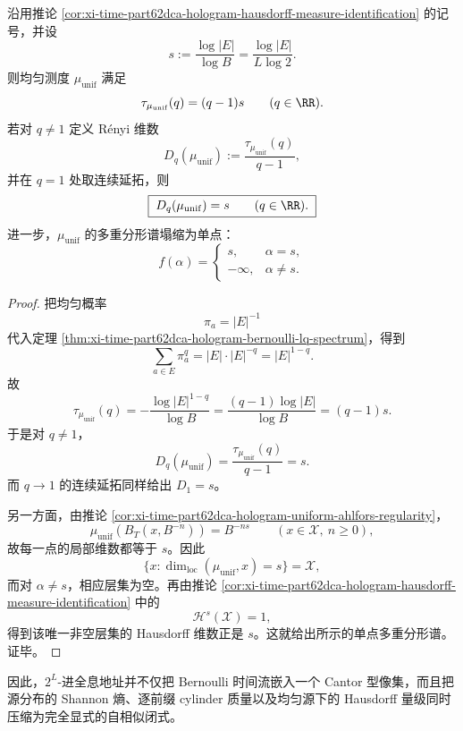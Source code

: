 \begin{corollary}\label{cor:xi-time-part62dca-hologram-uniform-monofractal-collapse}
沿用推论 \ref{cor:xi-time-part62dca-hologram-hausdorff-measure-identification} 的记号，并设
\[
s:=\frac{\log |E|}{\log B}
=
\frac{\log |E|}{L\log 2}.
\]
则均匀测度 \(\mu_{\mathrm{unif}}\) 满足
\[
\tau_{\mu_{\mathrm{unif}}}(q)=(q-1)s
\qquad
(q\in\RR).
\]
若对 \(q\neq 1\) 定义 Rényi 维数
\[
D_q(\mu_{\mathrm{unif}}):=\frac{\tau_{\mu_{\mathrm{unif}}}(q)}{q-1},
\]
并在 \(q=1\) 处取连续延拓，则
\[
\boxed{\;
D_q(\mu_{\mathrm{unif}})=s
\qquad
(q\in\RR).\;}
\]
进一步，\(\mu_{\mathrm{unif}}\) 的多重分形谱塌缩为单点：
\[
\boxed{\;
f(\alpha)=
\begin{cases}
s,& \alpha=s,\\
-\infty,& \alpha\neq s.
\end{cases}\;}
\]
\end{corollary}
\begin{proof}
把均匀概率
\[
\pi_a=|E|^{-1}
\]
代入定理 \ref{thm:xi-time-part62dca-hologram-bernoulli-lq-spectrum}，得到
\[
\sum_{a\in E}\pi_a^q
=
|E|\cdot |E|^{-q}
=
|E|^{1-q}.
\]
故
\[
\tau_{\mu_{\mathrm{unif}}}(q)
=
-\frac{\log |E|^{1-q}}{\log B}
=
\frac{(q-1)\log|E|}{\log B}
=(q-1)s.
\]
于是对 \(q\neq 1\)，
\[
D_q(\mu_{\mathrm{unif}})
=
\frac{\tau_{\mu_{\mathrm{unif}}}(q)}{q-1}
=
s.
\]
而 \(q\to 1\) 的连续延拓同样给出 \(D_1=s\)。

另一方面，由推论 \ref{cor:xi-time-part62dca-hologram-uniform-ahlfors-regularity}，
\[
\mu_{\mathrm{unif}}(B_T(x,B^{-n}))=B^{-ns}
\qquad
(x\in \mathcal X,\ n\ge 0),
\]
故每一点的局部维数都等于 \(s\)。因此
\[
\{x:\dim_{\mathrm{loc}}(\mu_{\mathrm{unif}},x)=s\}=\mathcal X,
\]
而对 \(\alpha\neq s\)，相应层集为空。再由推论
\ref{cor:xi-time-part62dca-hologram-hausdorff-measure-identification}
中的
\[
\mathcal H^s(\mathcal X)=1,
\]
得到该唯一非空层集的 Hausdorff 维数正是 \(s\)。这就给出所示的单点多重分形谱。证毕。
\end{proof}

\noindent
因此，\(2^L\)-进全息地址并不仅把 Bernoulli 时间流嵌入一个 Cantor 型像集，而且把源分布的 Shannon 熵、逐前缀 cylinder 质量以及均匀源下的 Hausdorff 量级同时压缩为完全显式的自相似闭式。

\endinput

